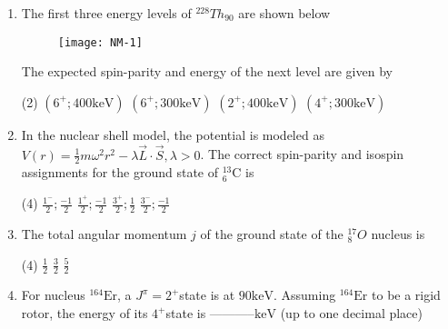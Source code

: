 \begin{enumerate}
\begin{tasks}
\end{tasks}
	\item The first three energy levels of ${ }^{228} T h_{90}$ are shown below
	\begin{figure}[H]
		\centering
		\texttt{[image: NM-1]}
	\end{figure}
	The expected spin-parity and energy of the next level are given by
	{}
 \begin{tasks}(2)
	\task[\textbf{a.}]$\left(6^{+} ; 400 \mathrm{keV}\right)$
	\task[\textbf{b.}]$\left(6^{+} ; 300 \mathrm{keV}\right)$
	\task[\textbf{c.}]$\left(2^{+} ; 400 \mathrm{keV}\right)$
	\task[\textbf{d.}] $\left(4^{+} ; 300 \mathrm{keV}\right)$
\end{tasks}
	\item  In the nuclear shell model, the potential is modeled as $V(r)=\frac{1}{2} m \omega^2 r^2-\lambda \vec{L} \cdot \vec{S}, \lambda>0$. The correct spin-parity and isospin assignments for the ground state of ${ }_6^{13} \mathrm{C}$ is
	{}
 \begin{tasks}(4)
	\task[\textbf{a.}]$\frac{1^{-}}{2} ; \frac{-1}{2}$
	\task[\textbf{b.}]$\frac{1^{+}}{2} ; \frac{-1}{2}$
	\task[\textbf{c.}]$\frac{3^{+}}{2} ; \frac{1}{2}$
	\task[\textbf{d.}] $\frac{3^{-}}{2} ; \frac{-1}{2}$
\end{tasks}
	\item  The total angular momentum $j$ of the ground state of the ${ }_8^{17} O$ nucleus is
	{}
 \begin{tasks}(4)
	\task[\textbf{a.}]$\frac{1}{2}$
	\task[\textbf{c.}]$\frac{3}{2}$
	\task[\textbf{d.}]$\frac{5}{2}$ 
\end{tasks}
	\item  For nucleus ${ }^{164} \mathrm{Er}$, a $J^\pi=2^{+}$state is at $90 \mathrm{keV}$. Assuming ${ }^{164} \mathrm{Er}$ to be a rigid rotor, the energy of its $4^{+}$state is -----------$\mathrm{keV}$ (up to one decimal place)
{}
\end{enumerate}
\setlength\arrayrulewidth{1pt}
